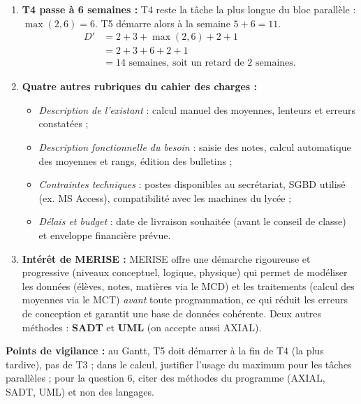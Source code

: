 \documentclass[11pt]{article}
\begin{document}
\begin{corrige}
\begin{enumerate}
  \begin{align*}
    D &= 2 + 3 + \max(2, 4) + 2 + 1 \\
      &= 2 + 3 + 4 + 2 + 1 \\
      &= 12 \text{ semaines.}
  \end{align*}
  \item \textbf{T4 passe à 6 semaines :} T4 reste la tâche la plus longue du bloc parallèle : $\max(2, 6) = 6$. T5 démarre alors à la semaine $5 + 6 = 11$.
  \begin{align*}
    D' &= 2 + 3 + \max(2, 6) + 2 + 1 \\
       &= 2 + 3 + 6 + 2 + 1 \\
       &= 14 \text{ semaines, soit un retard de 2 semaines.}
  \end{align*}
  \item \textbf{Quatre autres rubriques du cahier des charges :}
  \begin{itemize}
    \item \emph{Description de l'existant} : calcul manuel des moyennes, lenteurs et erreurs constatées ;
    \item \emph{Description fonctionnelle du besoin} : saisie des notes, calcul automatique des moyennes et rangs, édition des bulletins ;
    \item \emph{Contraintes techniques} : postes disponibles au secrétariat, SGBD utilisé (ex. MS Access), compatibilité avec les machines du lycée ;
    \item \emph{Délais et budget} : date de livraison souhaitée (avant le conseil de classe) et enveloppe financière prévue.
  \end{itemize}
  \item \textbf{Intérêt de MERISE :} MERISE offre une démarche rigoureuse et progressive (niveaux conceptuel, logique, physique) qui permet de modéliser les données (élèves, notes, matières via le MCD) et les traitements (calcul des moyennes via le MCT) \emph{avant} toute programmation, ce qui réduit les erreurs de conception et garantit une base de données cohérente. Deux autres méthodes : \textbf{SADT} et \textbf{UML} (on accepte aussi AXIAL).
\end{enumerate}
\textbf{Points de vigilance :} au Gantt, T5 doit démarrer à la fin de T4 (la plus tardive), pas de T3 ; dans le calcul, justifier l'usage du maximum pour les tâches parallèles ; pour la question 6, citer des méthodes du programme (AXIAL, SADT, UML) et non des langages.
\end{corrige}
\end{document}

